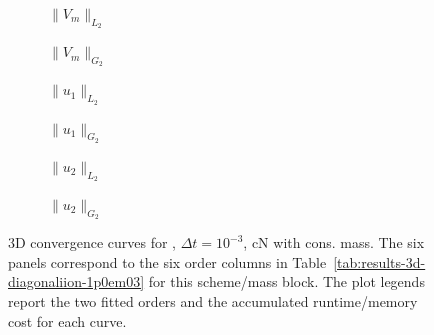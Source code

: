 \begin{figure}[p]
\centering
\begin{subfigure}{0.485\linewidth}
\centering
{}
\caption{$\|V_m\|_{L_2}$}
\label{fig:results-3d-diagonaliion-1p0em03-cranknicolson-consistent-a}
\end{subfigure}
\hfill
\begin{subfigure}{0.485\linewidth}
\centering
{}
\caption{$\|V_m\|_{G_2}$}
\label{fig:results-3d-diagonaliion-1p0em03-cranknicolson-consistent-b}
\end{subfigure}
\par\vspace{0.8em}
\begin{subfigure}{0.485\linewidth}
\centering
{}
\caption{$\|u_1\|_{L_2}$}
\label{fig:results-3d-diagonaliion-1p0em03-cranknicolson-consistent-c}
\end{subfigure}
\hfill
\begin{subfigure}{0.485\linewidth}
\centering
{}
\caption{$\|u_1\|_{G_2}$}
\label{fig:results-3d-diagonaliion-1p0em03-cranknicolson-consistent-d}
\end{subfigure}
\par\vspace{0.8em}
\begin{subfigure}{0.485\linewidth}
\centering
{}
\caption{$\|u_2\|_{L_2}$}
\label{fig:results-3d-diagonaliion-1p0em03-cranknicolson-consistent-e}
\end{subfigure}
\hfill
\begin{subfigure}{0.485\linewidth}
\centering
{}
\caption{$\|u_2\|_{G_2}$}
\label{fig:results-3d-diagonaliion-1p0em03-cranknicolson-consistent-f}
\end{subfigure}
\caption{3D convergence curves for , $\Delta t=10^{-3}$, cN with cons. mass. The six panels correspond to the six order columns in Table~\ref{tab:results-3d-diagonaliion-1p0em03} for this scheme/mass block. The plot legends report the two fitted orders and the accumulated runtime/memory cost for each curve.}
\label{fig:results-3d-diagonaliion-1p0em03-cranknicolson-consistent}
\end{figure}
\FloatBarrier

